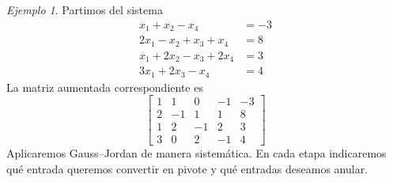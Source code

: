 \documentclass[12pt]{article}
\theoremstyle{remark}
\newtheorem{Ejem}[definicion]{Ejemplo}
\begin{document}
\begin{Ejem}
Partimos del sistema
\[
\begin{aligned}
x_{1} + x_{2} - x_{4} &= -3\\
2 x_{1} - x_{2} + x_{3} + x_{4} &= 8\\
x_{1} + 2 x_{2} - x_{3} + 2 x_{4} &= 3\\
3 x_{1} + 2 x_{3} - x_{4} &= 4
\end{aligned}
\]
La matriz aumentada correspondiente es
\[
\left[\begin{array}{cccc|c}
1 & 1 & 0 & -1 & -3\\
2 & -1 & 1 & 1 & 8\\
1 & 2 & -1 & 2 & 3\\
3 & 0 & 2 & -1 & 4
\end{array}\right]
\]
Aplicaremos Gauss--Jordan de manera sistemática. En cada etapa indicaremos qué entrada queremos convertir en pivote y qué entradas deseamos anular.



\end{Ejem}
\end{document}
